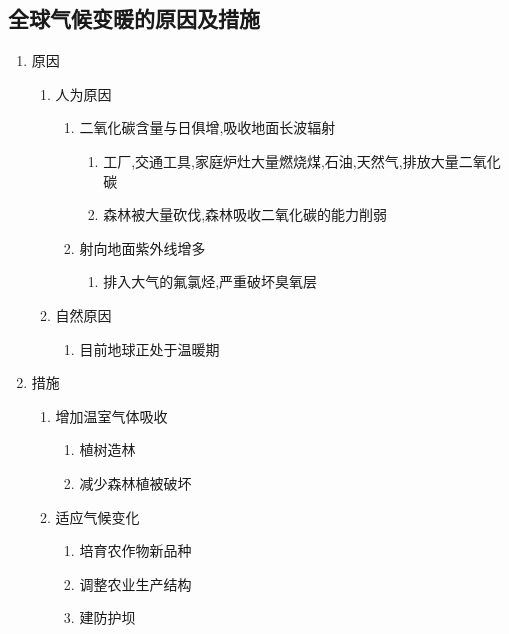 \documentclass[a4paper]{article}
\begin{document}
    \subsection{全球气候变暖的原因及措施}
    \begin{enumerate}
        \item 原因
        \begin{enumerate}
            \item 人为原因
            \begin{enumerate}
                \item 二氧化碳含量与日俱增,吸收地面长波辐射
                \begin{enumerate}
                    \item 工厂,交通工具,家庭炉灶大量燃烧煤,石油,天然气,排放大量二氧化碳
                    \item 森林被大量砍伐,森林吸收二氧化碳的能力削弱
                \end{enumerate}
                \item 射向地面紫外线增多
                \begin{enumerate}
                    \item 排入大气的氟氯烃,严重破坏臭氧层
                \end{enumerate}
            \end{enumerate}
            \item 自然原因
            \begin{enumerate}
                \item 目前地球正处于温暖期
            \end{enumerate}
        \end{enumerate}
        \item 措施
        \begin{enumerate}
            \item 增加温室气体吸收
            \begin{enumerate}
                \item 植树造林
                \item 减少森林植被破坏
            \end{enumerate}
            \item 适应气候变化
            \begin{enumerate}
                \item 培育农作物新品种
                \item 调整农业生产结构
                \item 建防护坝

\end{enumerate}
\end{enumerate}
\end{enumerate}
\end{document}
